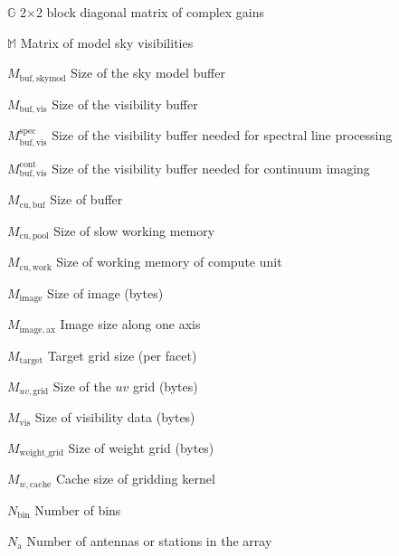 \documentclass[11pt,a4paper]{article}
\newcommand{\gainm}{\mathbb{G}} %
\newcommand{\modskyvism}{\mathbb{M}} %
\newcommand{\skymodbufsize}{M_\mathrm{buf,skymod}} %
\newcommand{\visbufsize}{M_\mathrm{buf,vis}} %
\newcommand{\visbufsizespec}{M^\mathrm{spec}_\mathrm{buf,vis}} %
\newcommand{\visbufsizecont}{M^\mathrm{cont}_\mathrm{buf,vis}} %
\newcommand{\bufsize}{M_\mathrm{cu,buf}} %
\newcommand{\slowmemsize}{M_\mathrm{cu,pool}} %
\newcommand{\cumemsize}{M_\mathrm{cu,work}} %
\newcommand{\imgsize}{M_\mathrm{image}} %
\newcommand{\imgsizeoneax}{M_\mathrm{image,ax}}	%
\newcommand{\targgridsize}{M_\mathrm{target}} %
\newcommand{\uvgridsize}{M_{uv,\mathrm{grid}}} %
\newcommand{\vissize}{M_\mathrm{vis}} %
\newcommand{\wgridsize}{M_\mathrm{weight\_grid}} %
\newcommand{\gridcachesize}{M_{w,\mathrm{cache}}} %
\newcommand{\ntel}{N_\mathrm{a}} %
\newcommand{\nbins}{N_\mathrm{bin}} %
\newcommand{\uv}{uv} %
\begin{document}
\begin{basedescript}{\desclabelstyle{\pushlabel}\desclabelwidth{6em}}
\item[$\gainm$] 2$\times$2 block diagonal matrix of complex
  gains\vspace{-0.2cm}
\item[$\modskyvism$] Matrix of model sky visibilities\vspace{-0.2cm}
\item[$\skymodbufsize$] Size of the sky model buffer\vspace{-0.2cm}
\item[$\visbufsize$] Size of the visibility buffer \vspace{-0.2cm}
\item[$\visbufsizespec$] Size of the visibility buffer needed for spectral line processing\vspace{-0.2cm}
\item[$\visbufsizecont$] Size of the visibility buffer needed for continuum imaging\vspace{-0.2cm}
\item[$\bufsize$] Size of buffer \vspace{-0.2cm}
\item[$\slowmemsize$] Size of slow working memory \vspace{-0.2cm}
\item[$\cumemsize$] Size of working memory of compute unit \vspace{-0.2cm}
\item[$\imgsize$] Size of image (bytes) \vspace{-0.2cm}
\item[$\imgsizeoneax$] Image size along one axis \vspace{-0.2cm}
\item[$\targgridsize$] Target grid size (per facet) \vspace{-0.2cm}
\item[$\uvgridsize$] Size of the $\uv$ grid (bytes) \vspace{-0.2cm}
\item[$\vissize$] Size of visibility data (bytes) \vspace{-0.2cm}
\item[$\wgridsize$] Size of weight grid (bytes)\vspace{-0.2cm}
\item[$\gridcachesize$] Cache size of gridding kernel \vspace{-0.2cm}
\item[$\nbins$] Number of bins \vspace{-0.2cm}
\item[$\ntel$] Number of antennas or stations in the array

\end{basedescript}
\end{document}
